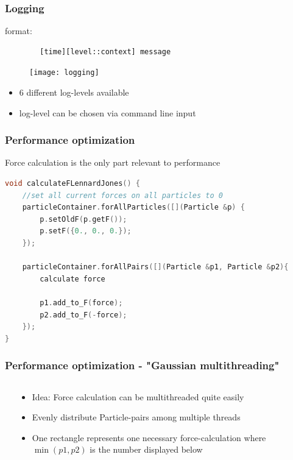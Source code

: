 \begin{frame}[fragile]
	\frametitle{Logging}
	\large
	format:
	\begin{lstlisting}
		[time][level::context] message
	\end{lstlisting}
	
	\begin{figure}
		\centering
		\texttt{[image: logging]}
		\label{fig:logging}
	\end{figure}
	
	
	\begin{itemize}
		\item 6 different log-levels available
		\item log-level can be chosen via command line input
	\end{itemize}
\end{frame}

\begin{frame}[fragile]
	\frametitle{Performance optimization}
	\large
	Force calculation is the only part relevant to performance
	\begin{lstlisting}[language=C++]
    void calculateFLennardJones() {
	//set all current forces on all particles to 0
	particleContainer.forAllParticles([](Particle &p) {
		p.setOldF(p.getF());
		p.setF({0., 0., 0.});
	});
	
	particleContainer.forAllPairs([](Particle &p1, Particle &p2){
		calculate force 
		
		p1.add_to_F(force);
		p2.add_to_F(-force);
	});
}

	\end{lstlisting}

\end{frame}

\begin{frame}
	\frametitle{Performance optimization - "Gaussian multithreading"}
	\vspace{1.5cm}
	\begin{columns}
		\begin{column}{0.48\textwidth}
		\end{column}
		\begin{column}{0.48\textwidth}
	\vspace{-6.5cm}
	\large
	\begin{itemize}
	\item Idea: Force calculation can be multithreaded quite easily 
	\item Evenly distribute Particle-pairs among multiple threads \\
	\item One rectangle represents one necessary force-calculation where $\min(p1,p2)$ is the number displayed below
	\end{itemize}
		\end{column}
	\end{columns}	
\end{frame}

